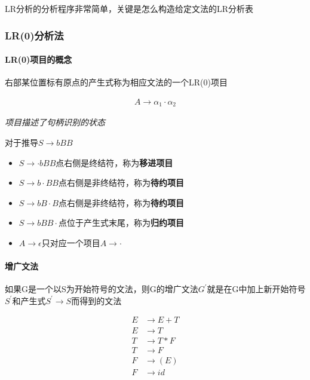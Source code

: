 \documentclass[UTF8]{ctexart} %
\begin{document}
LR分析的分析程序非常简单，关键是怎么构造给定文法的LR分析表

\subsubsection{LR(0)分析法}

\paragraph{LR(0)项目的概念} 右部某位置标有原点的产生式称为相应文法的一个LR(0)项目

\begin{equation}
    \begin{aligned}
        A\rightarrow \alpha_1\cdot \alpha_2
    \end{aligned}
\end{equation}

\emph{项目描述了句柄识别的状态}

对于推导$S\rightarrow bBB$

\begin{itemize}
    \item $S\rightarrow \cdot bBB$点右侧是终结符，称为\textbf{移进项目}
    \item $S\rightarrow b\cdot BB$点右侧是非终结符，称为\textbf{待约项目}
    \item $S\rightarrow bB\cdot B$点右侧是非终结符，称为\textbf{待约项目}
    \item $S\rightarrow bBB\cdot$点位于产生式末尾，称为\textbf{归约项目}
    \item $A\rightarrow \epsilon$只对应一个项目$A\rightarrow \cdot$
\end{itemize}

\paragraph{增广文法} 如果G是一个以S为开始符号的文法，则G的增广文法$G^{'}$就是在G中加上新开始符号$S^{'}$和产生式$S^{'}\rightarrow S$而得到的文法

\begin{equation}
    \begin{aligned}
        E & \rightarrow E+T \\
        E & \rightarrow T   \\
        T & \rightarrow T*F \\
        T & \rightarrow F   \\
        F & \rightarrow (E) \\
        F & \rightarrow id
    \end{aligned}
\end{equation}
\end{document}
